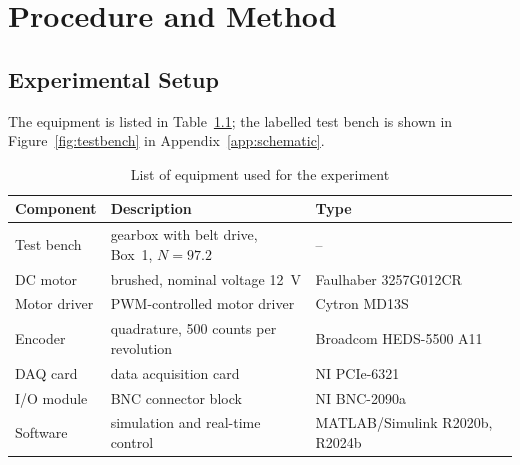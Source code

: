\chapter{Procedure and Method}\label{ch:procedure}

\section{Experimental Setup}\label{sec:setup}
The equipment is listed in Table~\ref{tab:equipment}; the labelled test bench is
shown in Figure~\ref{fig:testbench} in Appendix~\ref{app:schematic}.

\begin{table}[H]
  \centering
  \caption[List of equipment]{List of equipment used for the experiment
   \autocite{laboranleitung}}
  \label{tab:equipment}
  \begin{tabularx}{\textwidth}{l >{\raggedright\arraybackslash}X l}
    \toprule
    Component & Description & Type \\
    \midrule
    Test bench   & gearbox with belt drive, Box~1, $N = \num{97.2}$ & -- \\
    DC motor     & brushed, nominal voltage \qty{12}{\volt}
                 & Faulhaber 3257G012CR\autocite{faulhaber3257} \\
    Motor driver & PWM-controlled motor driver & Cytron MD13S\autocite{cytronMD13S} \\
    Encoder      & quadrature, \num{500} counts per revolution
                 & Broadcom HEDS-5500 A11\autocite{heds5500} \\
    DAQ card     & data acquisition card & NI PCIe-6321\autocite{niXseries} \\
    I/O module   & BNC connector block & NI BNC-2090a \\
    Software     & simulation and real-time control
                 & MATLAB/Simulink R2020b, R2024b \\
    \bottomrule
  \end{tabularx}
\end{table}

